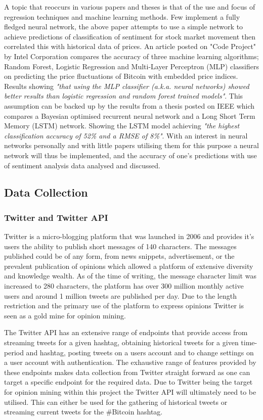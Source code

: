 \documentclass[oneside, 10pt]{article}
\begin{document}
		A topic that reoccurs in various papers and theses is that of the use and focus of regression techniques and machine learning methods. Few implement a fully fledged neural network, the above paper attempts to use a simple network to achieve predictions of classification of sentiment for stock market movement then correlated this with historical data of prices. An article posted on "Code Project" by Intel Corporation \cite{5} compares the accuracy of three machine learning algorithms; Random Forest, Logistic Regression and Multi-Layer Perceptron (MLP) classifiers on predicting the price fluctuations of Bitcoin with embedded price indices. Results showing \textit{"that using the MLP classifier (a.k.a. neural networks) showed better results than logistic regression and random forest trained models"}. This assumption can be backed up by the results from a thesis posted on IEEE \cite{6} which compares a Bayesian optimised recurrent neural network and a Long Short Term Memory (LSTM) network. Showing the LSTM model achieving \textit{"the highest classification accuracy of 52\% and a RMSE of 8\%"}. With an interest in neural networks personally and with little papers utilising them for this purpose a neural network will thus be implemented, and the accuracy of one's predictions with use of sentiment analysis data analysed and discussed.
			
		\subsection{Data Collection}\label{tweet_collection}
			
			\subsubsection{Twitter and Twitter API}
			Twitter is a micro-blogging platform that was launched in 2006 and provides it's users the ability to publish short messages of 140 characters. The messages published could be of any form, from news snippets, advertisement, or the prevalent publication of opinions which allowed a platform of extensive diversity and knowledge wealth. As of the time of writing, the message character limit was increased to 280 characters, the platform has over 300 million monthly active users and around 1 million tweets are published per day. Due to the length restriction and the primary use of the platform to express opinions Twitter is seen as a gold mine for opinion mining.
			
			The Twitter API has an extensive range of endpoints	that provide access from streaming tweets for a given hashtag, obtaining historical tweets for a given time-period and hashtag, posting tweets on a users account and to change settings on a user account with authentication. The exhaustive range of features provided by these endpoints makes data collection from Twitter straight forward as one can target a specific endpoint for the required data. Due to Twitter being the target for opinion mining within this project the Twitter API will ultimately need to be utilised. This can either be used for the gathering of historical tweets or streaming current tweets for the \#Bitcoin hashtag.
			
\end{document}
